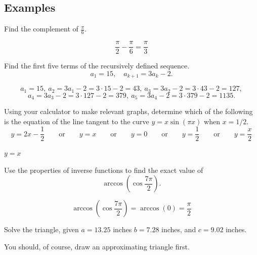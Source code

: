 \documentclass[12pt,addpoints, answers, fleqn]{exam}
\begin{document}
\subsection{Examples}


\begin{questions}
\question Find the complement of $\displaystyle \frac{\pi}{6}$.
\begin{solution}
\[
\frac{\pi}{2} - \frac{\pi}{6} =\boxed{\frac{\pi}{3}}
\]
\end{solution}
\question Find the first five terms of the recursively defined sequence.
\[
a_1 = 15, \quad a_{k+1} = 3 a_k - 2.
\]
\begin{solution}
\[
a_1 = \boxed{15}, \ a_2 = 3 a_1 - 2 = 3 \cdot 15 - 2 = \boxed{43}, \ a_3 = 3 a_2 - 2 = 3 \cdot 43 - 2 = \boxed{127},
\]
\[
a_4 = 3 a_3 - 2 = 3 \cdot 127 - 2 = \boxed{379}, \ a_5 = 3 a_4 - 2 = 3 \cdot 379 - 2 = \boxed{1135}.
\]
\end{solution}
\question Using your calculator to make relevant graphs, determine which of the following is the equation of the line tangent to the curve $y=x \sin \left( \pi x \right)$ when $x=1/2$.
\[
y = 2x - \frac{1}{2}  \qquad \mbox{or} \qquad y=x \qquad \mbox{or} \qquad y=0 \qquad \mbox{or} \qquad y=\frac{1}{2} \qquad \mbox{or} \qquad y =\frac{x}{2}
\]
\begin{solution}
$\boxed{y=x}$
\end{solution}
\question Use the properties of inverse functions to find the exact value of
\[
\arccos \left( \cos \frac{7 \pi }{ 2 } \right).
\]
\begin{solution}
\[
\arccos \left( \cos \frac{7 \pi }{ 2 } \right) = \arccos \left( 0 \right) = \boxed{\frac{\pi}{2}}
\]
\end{solution}
\question Solve the triangle, given $a = 13.25$ inches $b = 7.28$ inches, and $c = 9.02$ inches.
\begin{solution}
You should, of course, draw an approximating triangle first.


\end{solution}
\end{questions}
\end{document}
